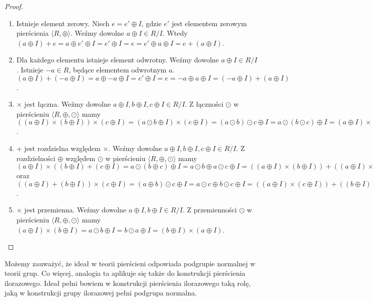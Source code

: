 \documentclass[polish,declaration,shortabstract]{iithesis}
\theoremstyle{definition}
\theoremstyle{remark} \newtheorem{observation}{Obserwacja}
\theoremstyle{plain} \newtheorem{theorem}{Twierdzenie}
\theoremstyle{plain} \newtheorem{lemma}{Lemat}
\theoremstyle{remark} \newtheorem*{remark*}{Uwaga}
\theoremstyle{reminder} \newtheorem*{reminder*}{Przypomnienie}
\begin{document}
\begin{proof}
\begin{enumerate}[resume,label=(\arabic*),leftmargin=.4in]
\begin{enumerate}[label=(3.\arabic*)]
		      	\item Istnieje element zerowy. Niech $e = e' \oplus I$, gdzie $e'$ jest elementem zerowym pierścienia $\langle R, \oplus \rangle$. Weźmy dowolne $a \oplus I \in R/I$. Wtedy $(a \oplus I) + e = a \oplus e' \oplus I = e' \oplus I = e = e' \oplus a \oplus I = e + (a \oplus I)$.
		      	\item Dla każdego elementu istnieje element odwrotny. Weźmy dowolne $a \oplus I \in R/I$. Istnieje $-a \in R$, będące elementem odwrotnym $a$. $(a \oplus I) + (-a \oplus I) = a \oplus -a \oplus I = e' \oplus I = e = -a \oplus a \oplus I = (-a \oplus I) + (a \oplus I)$.
		      	\item $\times$ jest łączna. Weźmy dowolne $a \oplus I, b \oplus I, c \oplus I \in R/I$. Z łączności $\odot$ w pierścieniu $\langle R, \oplus, \odot \rangle$ mamy $((a \oplus I) \times (b \oplus I)) \times (c \oplus I) = (a \odot b \oplus I) \times (c \oplus I) = (a \odot b) \odot c \oplus I = a \odot (b \odot c) \oplus I = (a \oplus I) \times (b \odot c \oplus I) = (a \oplus I) \times ((b \oplus I) \times (c \oplus I))$.
		      	\item + jest rozdzielna względem $\times$. Weźmy dowolne $a \oplus I, b \oplus I, c \oplus I \in R/I$. Z rozdzielności $\oplus$ względem $\odot$ w pierścieniu $\langle R, \oplus, \odot \rangle$ mamy $(a \oplus I) \times ((b \oplus I) + (c \oplus I) = a \odot (b \oplus c) \oplus I = a \odot b \oplus a \odot c \oplus I = ((a \oplus I) \times (b \oplus I)) + ((a \oplus I) \times (c \oplus I)))$ oraz $((a \oplus I) + (b \oplus I)) \times (c \oplus I) = (a \oplus b) \odot c \oplus I = a \odot c \oplus b \odot c \oplus I = ((a \oplus I) \times (c \oplus I)) + ((b \oplus I) \times (c \oplus I))$.
		      	\item $\times$ jest przemienna. Weźmy dowolne $a \oplus I, b \oplus I \in R/I$. Z przemienności $\odot$ w pierścieniu $\langle R, \oplus, \odot \rangle$ mamy $(a \oplus I) \times (b \oplus I) = a \odot b \oplus I = b \odot a \oplus I = (b \oplus I) \times (a \oplus I)$.
		      \end{enumerate}
	\end{enumerate}
\end{proof}

Możemy zauważyć, że ideał w teorii pierścieni odpowiada podgrupie normalnej w teorii grup. Co więcej, analogia ta aplikuje się także do konstrukcji pierścienia ilorazowego. Ideał pełni bowiem w konstrukcji pierścienia ilorazowego taką rolę, jaką w konstrukcji grupy ilorazowej pełni podgrupa normalna.
\end{document}

